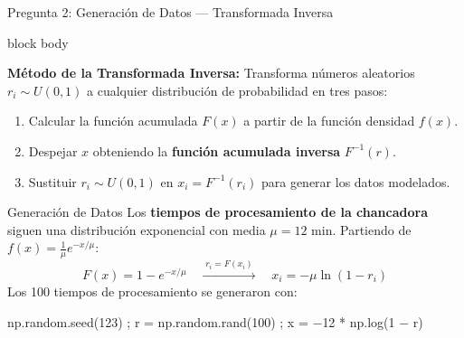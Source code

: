 \documentclass[aspectratio=169, 10pt]{beamer}
\newenvironment{emptyblock}
{
  \begin{beamercolorbox}[
      wd=\linewidth,
      sep=0.2cm,
      rounded=true
    ]{block body}
}
{
  \end{beamercolorbox}
}
\begin{document}
\begin{frame}{Pregunta 2: Generación de Datos — Transformada Inversa}
	\begin{emptyblock}
		\justifying
		\textbf{Método de la Transformada Inversa:} Transforma números aleatorios $r_i \sim U(0,1)$ a cualquier distribución de probabilidad en tres pasos:
		\begin{enumerate}
			\small
			\item Calcular la función acumulada $F(x)$ a partir de la función densidad $f(x)$.
			\item Despejar $x$ obteniendo la \textbf{función acumulada inversa} $F^{-1}(r)$.
			\item Sustituir $r_i \sim U(0,1)$ en $x_i = F^{-1}(r_i)$ para generar los datos modelados.
		\end{enumerate}
	\end{emptyblock}
	\begin{exampleblock}{Generación de Datos}
		\justifying\small
		Los \textbf{tiempos de procesamiento de la chancadora} siguen una distribución
		exponencial con media $\mu = 12$ min. Partiendo de $f(x) = \frac{1}{\mu}e^{-x/\mu}$:
		\[
			F(x) = 1 - e^{-x/\mu}
			\quad\xrightarrow{\;r_i = F(x_i)\;}\quad
			x_i = -\mu\ln(1 - r_i)
		\]
		Los 100 tiempos de procesamiento se generaron con:
		\vspace{-4pt}
		\begin{center}
			\ttfamily\small
			np.random.seed(123) \quad;\quad
			r = np.random.rand(100) \quad;\quad
			x = $-$12 * np.log(1 $-$ r)
		\end{center}
	\end{exampleblock}
\end{frame}
\end{document}
